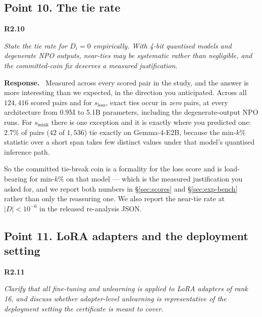 \documentclass[11pt,a4paper]{article}
\newenvironment{point}[1]{%
  \par\medskip\noindent\textbf{\color{rcol}#1}\par\nopagebreak\smallskip\begingroup
  \color{rcol}\itshape}{\endgroup\par}
\newenvironment{reply}{%
  \par\smallskip\noindent\textbf{\color{acol}Response.}\ \begingroup}{\endgroup\par}
\begin{document}
\subsection*{Point 10. The tie rate}

\begin{point}{R2.10}
State the tie rate for $D_i = 0$ empirically. With 4-bit quantised models and degenerate
NPO outputs, near-ties may be systematic rather than negligible, and the committed-coin
fix deserves a measured justification.
\end{point}

\begin{reply}
Measured across every scored pair in the study, and the answer is more
interesting than we expected, in the direction you anticipated. Across all $124{,}416$ scored pairs and for
$s_{\mathrm{loss}}$, exact ties occur in \emph{zero} pairs, at every architecture from
0.9M to 5.1B parameters, including the degenerate-output NPO runs. For
$s_{\mathrm{mink}}$ there is one exception and it is exactly where you predicted one:
$2.7\%$ of pairs ($42$ of $1{,}536$) tie exactly on Gemma-4-E2B, because the min-$k\%$
statistic over a short span takes few distinct values under that model's quantised
inference path.

So the committed tie-break coin is a formality for the loss score and is
load-bearing for min-$k\%$ on that model --- which is the measured justification you
asked for, and we report both numbers in \S\ref{sec:scores} and \S\ref{sec:exp-bench} rather than only the reassuring
one. We also report the near-tie rate at $|D| < 10^{-6}$ in the released re-analysis
JSON.
\end{reply}

\subsection*{Point 11. LoRA adapters and the deployment setting}

\begin{point}{R2.11}
Clarify that all fine-tuning and unlearning is applied to LoRA adapters of rank 16, and
discuss whether adapter-level unlearning is representative of the deployment setting the
certificate is meant to cover.
\end{point}
\end{document}
